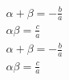 \documentclass{oblivoir}
\begin{document}
	\begin{equation}
	\begin{gathered}
		\alpha + \beta = -\frac{b}{a}\\
		\alpha\beta = \frac{c}{a}
	\end{gathered}
	\end{equation}
	\begin{gather}
		\alpha + \beta = -\frac{b}{a}\\
		\alpha\beta = \frac{c}{a}
	\end{gather}
\end{document}
